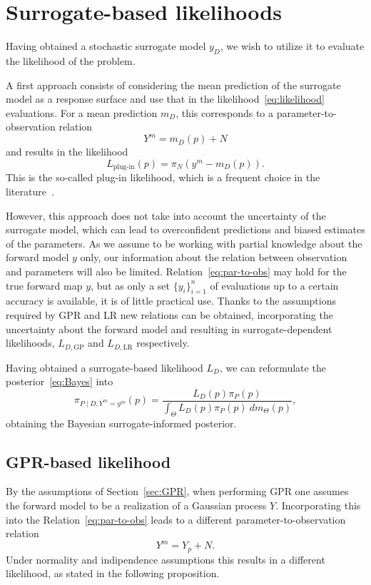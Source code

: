 \section{Surrogate-based likelihoods}\label{sec:likelihoods}
Having obtained a stochastic surrogate model $y_D$, we wish to utilize it to evaluate the likelihood of the problem.

A first approach consists of considering the mean prediction of the surrogate model as a response surface and use that in the likelihood~\eqref{eq:likelihood} evaluations. 
For a mean prediction $m_D$, this corresponds to a parameter-to-observation relation 
\begin{equation}\label{eq:plug-in-par-to-obs}
    Y^m = m_D(p) + N
\end{equation}
and results in the likelihood
\begin{equation}\label{eq:plug-in-likelihood}
    L_{\text{plug-in}}(p) = \pi_N(y^m - m_D(p)).
\end{equation}
This is the so-called plug-in likelihood, which is a frequent choice in the literature~\cite{SinsbeckNowak2017}. 

However, this approach does not take into account the uncertainty of the surrogate model, which can lead to overconfident predictions and biased estimates of the parameters.
As we assume to be working with partial knowledge about the forward model $y$ only, our information about the relation between observation and parameters will also be limited. 
Relation~\eqref{eq:par-to-obs} may hold for the true forward map $y$, but as only a set $\{y_i\}_{i=1}^n$ of evaluations up to a certain accuracy is available, it is of little practical use. 
Thanks to the assumptions required by GPR and LR new relations can be obtained, incorporating the uncertainty about the forward model and resulting in surrogate-dependent likelihoods, $L_{D, \text{GP}}$ and $L_{D, \text{LR}}$ respectively. 

Having obtained a surrogate-based likelihood $L_D$, we can reformulate the posterior~\eqref{eq:Bayes} into 
\begin{equation} \label{eq:surr-posterior}
    \pi_{P\mid D, Y^m = y^m}(p) = \frac{L_D(p) \pi_P(p)}{\int_\Theta  L_D(p) \pi_P(p) \ dm_\Theta(p)},
\end{equation}
obtaining the Bayesian surrogate-informed posterior.

\subsection{GPR-based likelihood}\label{sec:GPlike}
By the assumptions of Section~\ref{sec:GPR}, when performing GPR one assumes the forward model to be a realization of a Gaussian process $Y$.
Incorporating this into the Relation~\eqref{eq:par-to-obs} leads to a different parameter-to-observation relation
\begin{equation}\label{eq:GPR-par-to-obs}
    Y^m = Y_p + N.
\end{equation}
Under normality and indipendence assumptions this results in a different likelihood, as stated in the following proposition.

